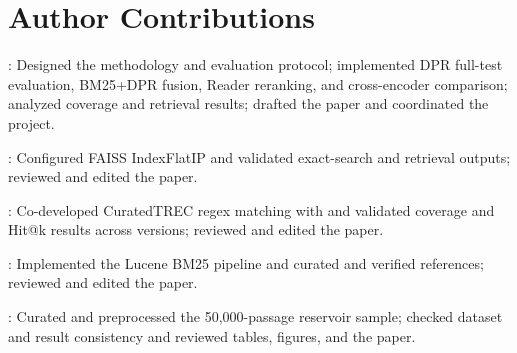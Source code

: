 \section*{Author Contributions}

: Designed the methodology and evaluation protocol; implemented DPR full-test evaluation, BM25+DPR fusion, Reader reranking, and cross-encoder comparison; analyzed coverage and retrieval results; drafted the paper and coordinated the project.

: Configured FAISS IndexFlatIP and validated exact-search and retrieval outputs; reviewed and edited the paper.

: Co-developed CuratedTREC regex matching with  and validated coverage and Hit@k results across versions; reviewed and edited the paper.

: Implemented the Lucene BM25 pipeline and curated and verified references; reviewed and edited the paper.

: Curated and preprocessed the 50,000-passage reservoir sample; checked dataset and result consistency and reviewed tables, figures, and the paper.

